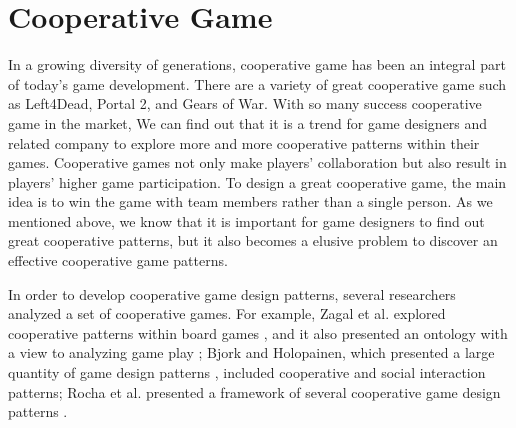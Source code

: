 \section{Cooperative Game}


In a growing diversity of generations, cooperative game has been an integral part of today's game development. There are a variety of great cooperative game such as Left4Dead, Portal 2, and Gears of War. With so many success cooperative game in the market, We can find out that it is a trend for game designers and related company to explore more and more cooperative patterns within their games. Cooperative games not only make players' collaboration but also result in players' higher game participation. To design a great cooperative game, the main idea is to win the game with team members rather than a single person. As we mentioned above, we know that it  is important for game designers to find out great cooperative patterns, but it also becomes a elusive problem to discover an effective cooperative game patterns.


In order to develop cooperative game design patterns, several researchers analyzed a set of cooperative games. For example, Zagal et al. explored cooperative patterns within board games \cite{CG1}, and it also presented an ontology with a view to analyzing game play \cite{CG3}; Bjork and Holopainen, which presented a large quantity of game design patterns \cite{CG2}, included cooperative and social interaction patterns; Rocha et al. presented a framework of several cooperative game design patterns \cite{CG4}.

